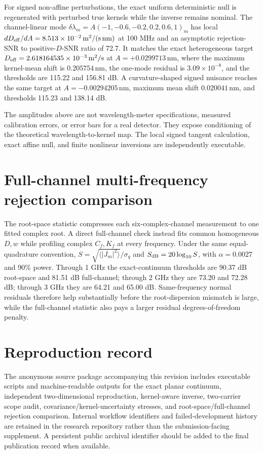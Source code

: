 \documentclass[aps,pra,onecolumn,superscriptaddress,nofootinbib]{revtex4-2}
\begin{document}
For signed non-affine perturbations, the exact uniform deterministic null is regenerated with perturbed true kernels while the inverse remains nominal. The channel-linear mode $\delta\lambda_m=A(-1,-0.6,-0.2,0.2,0.6,1)_m$ has local $dD_{\rm eff}/dA=8.513\times10^{-2}\,\mathrm{m^2/(s\,nm)}$ at 100 MHz and an asymptotic rejection-SNR to positive-$D$-SNR ratio of 72.7. It matches the exact heterogeneous target $D_{\rm eff}=2.618164535\times10^{-3}\,\mathrm{m^2/s}$ at $A=+0.0299713\,\mathrm{nm}$, where the maximum kernel-mean shift is $0.205754\,\mathrm{nm}$, the one-mode residual is $3.09\times10^{-8}$, and the thresholds are 115.22 and 156.81 dB. A curvature-shaped signed nuisance reaches the same target at $A=-0.00294205\,\mathrm{nm}$, maximum mean shift $0.020041\,\mathrm{nm}$, and thresholds 115.23 and 138.14 dB.

The amplitudes above are not wavelength-meter specifications, measured calibration errors, or error bars for a real detector. They expose conditioning of the theoretical wavelength-to-kernel map. The local signed tangent calculation, exact affine null, and finite nonlinear inversions are independently executable.

\section{Full-channel multi-frequency rejection comparison}

The root-space statistic compresses each six-complex-channel measurement to one fitted complex root. A direct full-channel check instead fits common homogeneous $D,w$ while profiling complex $C_f,K_f$ at every frequency. Under the same equal-quadrature convention, $S=\sqrt{\langle|J_m|^2\rangle}/\sigma_q$ and $S_{\rm dB}=20\log_{10}S$, with $\alpha=0.0027$ and 90\% power. Through 1 GHz the exact-continuum thresholds are 90.37 dB root-space and 81.51 dB full-channel; through 2 GHz they are 73.20 and 72.28 dB; through 3 GHz they are 64.21 and 65.00 dB. Same-frequency normal residuals therefore help substantially before the root-dispersion mismatch is large, while the full-channel statistic also pays a larger residual degrees-of-freedom penalty.

\section{Reproduction record}

The anonymous source package accompanying this revision includes executable scripts and machine-readable outputs for the exact planar continuum, independent two-dimensional reproduction, kernel-aware inverse, two-carrier scope audit, covariance/kernel-uncertainty stresses, and root-space/full-channel rejection comparison. Internal workflow identifiers and failed-development history are retained in the research repository rather than the submission-facing supplement. A persistent public archival identifier should be added to the final publication record when available.



\end{document}
